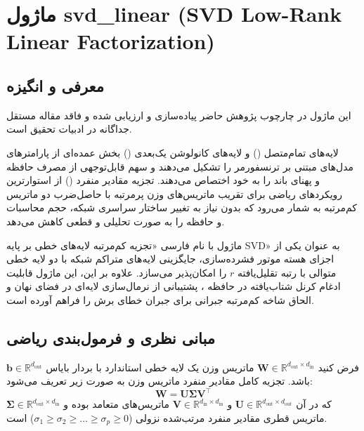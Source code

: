 \section{ماژول svd\_linear (SVD Low-Rank Linear Factorization)}
\label{sec:module_svd_linear}

\subsection{معرفی و انگیزه}
این ماژول در چارچوب پژوهش حاضر پیاده‌سازی و ارزیابی شده و فاقد مقاله مستقل جداگانه در ادبیات تحقیق است.

لایه‌های تمام‌متصل () و لایه‌های کانولوشن یک‌بعدی () بخش عمده‌ای از پارامترهای مدل‌های مبتنی بر ترنسفورمر را تشکیل می‌دهند و سهم قابل‌توجهی از مصرف حافظه و پهنای باند را به خود اختصاص می‌دهند. تجزیه مقادیر منفرد () از استوارترین رویکردهای ریاضی برای تقریب ماتریس‌های وزن پرمرتبه با حاصل‌ضرب دو ماتریس کم‌مرتبه به شمار می‌رود که بدون نیاز به تغییر ساختار سراسری شبکه، حجم محاسبات و حافظه را به صورت تحلیلی و قطعی کاهش می‌دهد.

ماژول  با نام فارسی «تجزیه کم‌مرتبه لایه‌های خطی بر پایه SVD» به عنوان یکی از اجزای هسته موتور فشرده‌سازی، جایگزینی لایه‌های متراکم شبکه با دو لایه خطی متوالی با رتبه تقلیل‌یافته $r$ را امکان‌پذیر می‌سازد. علاوه بر این، این ماژول قابلیت ادغام کرنل شتاب‌یافته  در حافظه ، پشتیبانی از نرمال‌سازی لایه‌ای  در فضای نهان و الحاق شاخه کم‌مرتبه جبرانی  برای جبران خطای برش را فراهم آورده است.

\subsection{مبانی نظری و فرمول‌بندی ریاضی}
فرض کنید $\mathbf{W} \in \mathbb{R}^{d_{\text{out}} \times d_{\text{in}}}$ ماتریس وزن یک لایه خطی استاندارد با بردار بایاس $\mathbf{b} \in \mathbb{R}^{d_{\text{out}}}$ باشد. تجزیه کامل مقادیر منفرد ماتریس وزن به صورت زیر تعریف می‌شود:
\begin{equation}
\mathbf{W} = \mathbf{U} \mathbf{\Sigma} \mathbf{V}^\top
\end{equation}
که در آن $\mathbf{U} \in \mathbb{R}^{d_{\text{out}} \times d_{\text{out}}}$ و $\mathbf{V} \in \mathbb{R}^{d_{\text{in}} \times d_{\text{in}}}$ ماتریس‌های متعامد بوده و $\mathbf{\Sigma} \in \mathbb{R}^{d_{\text{out}} \times d_{\text{in}}}$ ماتریس قطری مقادیر منفرد مرتب‌شده نزولی ($\sigma_1 \ge \sigma_2 \ge \dots \ge \sigma_p \ge 0$) است.

